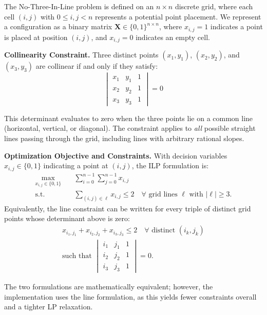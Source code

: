 \documentclass{article}
\theoremstyle{plain}
\theoremstyle{definition}
\theoremstyle{remark}
\begin{document}
The No-Three-In-Line problem is defined on an $n \times n$ discrete grid, where each cell $(i,j)$ with $0 \leq i,j < n$ represents a potential point placement. We represent a configuration as a binary matrix $\mathbf{X} \in \{0,1\}^{n \times n}$, where $x_{i,j} = 1$ indicates a point is placed at position $(i,j)$, and $x_{i,j} = 0$ indicates an empty cell.

\textbf{Collinearity Constraint.} Three distinct points $(x_1, y_1)$, $(x_2, y_2)$, and $(x_3, y_3)$ are collinear if and only if they satisfy:
\begin{equation}
\begin{vmatrix}
x_1 & y_1 & 1 \\
x_2 & y_2 & 1 \\
x_3 & y_3 & 1
\end{vmatrix} = 0
\end{equation}

This determinant evaluates to zero when the three points lie on a common line (horizontal, vertical, or diagonal). The constraint applies to \textit{all} possible straight lines passing through the grid, including lines with arbitrary rational slopes.

\textbf{Optimization Objective and Constraints.} With decision variables $x_{i,j} \in \{0,1\}$ indicating a point at $(i,j)$, the ILP formulation is:
\begin{align}
\max_{x_{i,j} \in \{0,1\}} \quad & \sum_{i=0}^{n-1} \sum_{j=0}^{n-1} x_{i,j} \\
\text{s.t.} \quad & \sum_{(i,j) \in \ell} x_{i,j} \le 2 \quad \forall \text{ grid lines } \ell \text{ with } |\ell| \ge 3.
\end{align}
Equivalently, the line constraint can be written for every triple of distinct grid points whose determinant above is zero:
\begin{equation}
\begin{split}
x_{i_1,j_1} + x_{i_2,j_2} + x_{i_3,j_3} \le 2 \quad \forall \text{ distinct } (i_k, j_k) \\
\text{such that }
\begin{vmatrix}
i_1 & j_1 & 1 \\
i_2 & j_2 & 1 \\
i_3 & j_3 & 1
\end{vmatrix}
= 0.
\end{split}
\end{equation}

The two formulations are mathematically equivalent; however, the implementation uses the line formulation, as this yields fewer constraints overall and a tighter LP relaxation.
\end{document}

